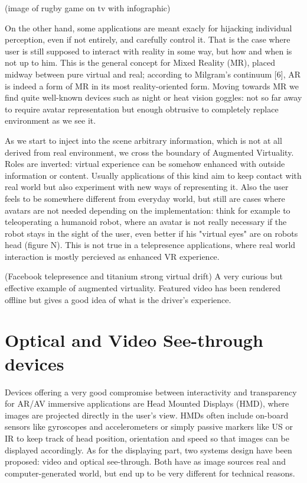 (image of rugby game on tv with infographic)

On the other hand, some applications are meant exacly for hijacking individual perception, even if not entirely, and carefully control it. That is the case where user is still supposed to interact with reality in some way, but how and when is not up to him. This is the general concept for Mixed Reality (MR), placed midway between pure virtual and real; according to Milgram’s continuum [6], AR is indeed a form of MR in its most reality-oriented form. Moving towards MR we find quite well-known devices such as night or heat vision goggles: not so far away to require avatar representation but enough obtrusive to completely replace environment as we see it.

As we start to inject into the scene arbitrary information, which is not at all derived from real environment, we cross the boundary of Augmented Virtuality. Roles are inverted: virtual experience can be somehow enhanced with outside information or content. Usually applications of this kind aim to keep contact with real world but also experiment with new ways of representing it. Also the user feels to be somewhere different from everyday world, but still are cases where avatars are not needed depending on the implementation: think for example to teleoperating a humanoid robot, where an avatar is not really necessary if the robot stays in the sight of the user, even better if his "virtual eyes" are on robots head (figure N). This is not true in a telepresence applications, where real world interaction is mostly percieved as enhanced VR experience.

(Facebook telepresence and titanium strong virtual drift) A very curious but effective example of augmented virtuality. Featured video has been rendered offline but gives a good idea of what is the driver's experience.

\section{Optical and Video See-through devices} %
Devices offering a very good compromise between interactivity and transparency for AR/AV immersive applications are Head Mounted Displays (HMD), where images are projected directly in the user’s view. HMDs often include on-board sensors like gyroscopes and accelerometers or simply passive markers like US or IR to keep track of head position, orientation and speed so that images can be displayed accordingly. As for the displaying part, two systems design have been proposed: video and optical see-through. Both have as image sources real and computer-generated world, but end up to be very different for technical reasons.


